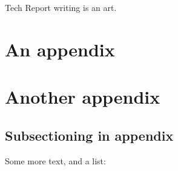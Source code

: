 \documentclass[12pt, letterpaper, twoside]{article}
\begin{document}
Tech Report writing is an art.




% 
% 

\appendix

\section{An appendix}

\blindtext %

\section{Another appendix}

\subsection*{Subsectioning in appendix}

Some more text, and a list:

\blindenumerate %
\end{document}
